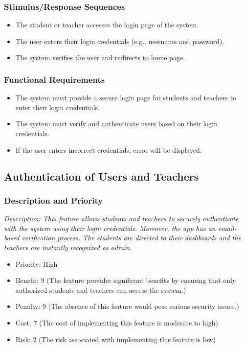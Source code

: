 \documentclass{article}
\begin{document}
\subsubsection{Stimulus/Response Sequences}
\begin{itemize}
  \item The student or teacher accesses the login page of the system.
  \item The user enters their login credentials (e.g., username and password).
  \item The system verifies the user and redirects to home page.
\end{itemize}

\subsubsection{Functional Requirements}
\begin{itemize}
\item The system must provide a secure login page for students and teachers to enter their login credentials.
\item The system must verify and authenticate users based on their login credentials.
\item If the user enters incorrect credentials, error will be displayed.
\end{itemize}





\subsection{Authentication of Users and Teachers}
\subsubsection{Description and Priority}
\emph{Description: This feature allows students and teachers to securely authenticate with the system using their login credentials. Moreover, the app has an email-based verification process. The students are directed to their dashboards and the teachers are instantly recognized as admin.}
\begin{itemize}
  \item Priority: High
  \item Benefit: 9 (The feature provides significant benefits by ensuring that only authorized students and teachers can access the system.)
  \item Penalty: 9 (The absence of this feature would pose serious security issues.)
  \item Cost: 7 (The cost of implementing this feature is moderate to high)
  \item Risk: 2 (The risk associated with implementing this feature is low)
\end{itemize}
\end{document}

